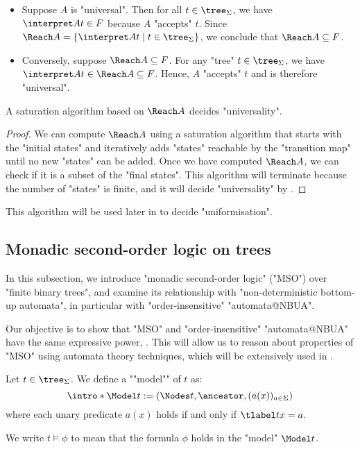 \documentclass[a4paper,UKenglish,cleveref, autoref, thm-restate]{lipics-v2021}
\begin{document}
\begin{proofI}
	\begin{itemize}
		\item Suppose $A$ is "universal". Then for all $t \in \tree_\Sigma$, we have $\interpret A t \in F$ because $A$ "accepts" $t$.
		      Since $\Reach A = \setdef {\interpret A t} {t \in \tree_\Sigma}$, we conclude that $\Reach A \subseteq F$.

		\item Conversely, suppose $\Reach A \subseteq F$. For any "tree" $t \in \tree_\Sigma$, we have $\interpret A t \in \Reach A \subseteq F$.
		      Hence, $A$ "accepts" $t$ and is therefore "universal".
	\end{itemize}
\end{proofI}

\begin{coro}\label{coro:univeral-Reach}
	A saturation algorithm based on $\Reach A$ decides "universality".
\end{coro}

\begin{proof}
	We can compute $\Reach A$ using a saturation algorithm that starts with the "initial states" and iteratively adds "states" reachable by the "transition map" until no new "states" can be added.
	Once we have computed $\Reach A$, we can check if it is a subset of the "final states". This algorithm will terminate because the number of "states" is finite,
	and it will decide "universality" by .
\end{proof}

This algorithm will be used later in  to decide "uniformisation".

\subsection{Monadic second-order logic on trees}\label{sec:MSO}
In this subsection, we introduce "monadic second-order logic" ("MSO") over "finite binary trees", and examine its relationship with
"non-deterministic bottom-up automata", in particular with "order-insensitive" "automata@NBUA".

Our objective is to show that "MSO" and "order-insensitive" "automata@NBUA" have the same expressive power, . This will allow us to reason about properties
of "MSO" using automata theory techniques, which will be extensively used in .

\begin{definition}
	\AP Let $t \in \tree_{\Sigma}$. We define a ""model"" of $t$ as:
	\[
		\intro* \Model t := (\Nodes t, \ancestor , (a (x))_{a \in \Sigma})
	\]
	where each unary predicate $a(x)$ holds if and only if $\tlabel t x = a $.

	We write $t \models \phi$ to mean that the formula $\phi$ holds in the "model" $\Model t$.
\end{definition}
\end{document}
